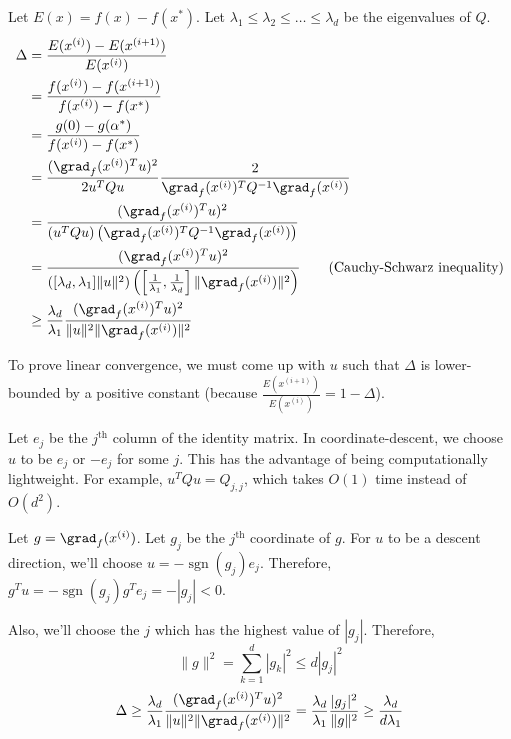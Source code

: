 Let $E(x) = f(x) - f(x^*)$.
Let $\lambda_1 \le \lambda_2 \le \ldots \le \lambda_d$ be the eigenvalues of $Q$.
\begin{align*}
\Delta &= \frac{E(x^{(i)}) - E(x^{(i+1)})}{E(x^{(i)})}
\\ &= \frac{f(x^{(i)}) - f(x^{(i+1)})}{f(x^{(i)}) - f(x^*)}
\\ &= \frac{g(0) - g(\alpha^*)}{f(x^{(i)}) - f(x^*)}
\\ &= \frac{(\grad_f(x^{(i)})^Tu)^2}{2u^TQu} \frac{2}{\grad_f(x^{(i)})^T Q^{-1} \grad_f(x^{(i)})}
\\ &= \frac{(\grad_f(x^{(i)})^Tu)^2}{(u^TQu)\left(\grad_f(x^{(i)})^T Q^{-1} \grad_f(x^{(i)})\right)}
\\ &= \frac{(\grad_f(x^{(i)})^Tu)^2}{\left( [\lambda_d, \lambda_1]\|u\|^2 \right)
    \left( \left[\frac{1}{\lambda_1}, \frac{1}{\lambda_d}\right]\|\grad_f(x^{(i)})\|^2 \right)}
    \tag{Cauchy-Schwarz inequality}
\\ &\ge \frac{\lambda_d}{\lambda_1} \frac{(\grad_f(x^{(i)})^Tu)^2}{\|u\|^2 \|\grad_f(x^{(i)})\|^2}
\end{align*}

To prove linear convergence, we must come up with $u$
such that $\Delta$ is lower-bounded by a positive constant
(because $\frac{E(x^{(i+1)})}{E(x^{(i)})} = 1 - \Delta$).

Let $e_j$ be the $j^{\textrm{th}}$ column of the identity matrix.
In coordinate-descent, we choose $u$ to be $e_j$ or $-e_j$ for some $j$.
This has the advantage of being computationally lightweight.
For example, $u^TQu = Q_{j,j}$, which takes $O(1)$ time instead of $O(d^2)$.

Let $g = \grad_f(x^{(i)})$. Let $g_j$ be the $j^{\textrm{th}}$ coordinate of $g$.
For $u$ to be a descent direction, we'll choose $u = -\operatorname{sgn}(g_j)e_j$.
Therefore, $g^Tu = -\operatorname{sgn}(g_j) g^Te_j = -|g_j| < 0$.

Also, we'll choose the $j$ which has the highest value of $|g_j|$.
Therefore,
\[ \|g\|^2 = \sum_{k=1}^d |g_k|^2 \le d |g_j|^2 \]
\[ \Delta \ge \frac{\lambda_d}{\lambda_1} \frac{(\grad_f(x^{(i)})^Tu)^2}{\|u\|^2 \|\grad_f(x^{(i)})\|^2}
= \frac{\lambda_d}{\lambda_1} \frac{|g_j|^2}{\|g\|^2} \ge \frac{\lambda_d}{d\lambda_1} \]



